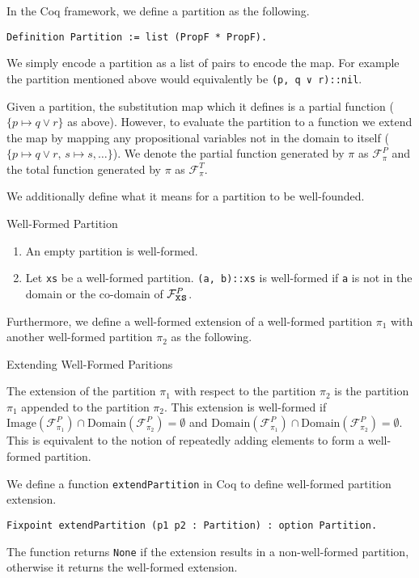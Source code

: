 \documentclass{llncs}
\begin{document}
In the Coq framework, we define a partition as the following.
%
\begin{verbatim}
Definition Partition := list (PropF * PropF).
\end{verbatim}
%
We simply encode a partition as a list of pairs to encode the map. For example
the partition mentioned above would equivalently be \verb+(p, q ∨ r)::nil+.

Given a partition, the substitution map which it defines is a partial function
($\{p \mapsto q \lor r\}$ as above). However, to evaluate the partition to a
function we extend the map by mapping any propositional variables not in the
domain to itself ($\{p \mapsto q \lor r, \, s \mapsto s, \ldots\}$). We denote
the partial function generated by $\pi$ as $\mathcal{F}^{P}_{\pi}$ and the
total function generated by $\pi$ as $\mathcal{F}^{T}_{\pi}$.

We additionally define what it means for a partition to be well-founded. 
%
\begin{definition}{Well-Formed Partition}
\begin{enumerate}
\item An empty partition is well-formed.
\item Let \verb+xs+ be a well-formed partition. \verb+(a, b)::xs+ is
well-formed if \verb+a+ is not in the domain or the co-domain of
$\mathcal{F}^{P}_{\verb+xs+}$.
\end{enumerate}
\end{definition}
%
Furthermore, we define a well-formed extension of a well-formed partition
$\pi_1$ with another well-formed partition $\pi_2$ as the following.

\begin{definition}{Extending Well-Formed Paritions}

The extension of the partition $\pi_1$ with respect to the partition $\pi_2$ is
the partition $\pi_1$ appended to the partition $\pi_2$. This extension is
well-formed if
$\textrm{Image}(\mathcal{F}^{P}_{\pi_1}) \cap
\textrm{Domain}(\mathcal{F}^{P}_{\pi_2}) = \emptyset$ and
$\textrm{Domain}(\mathcal{F}^{P}_{\pi_1}) \cap
\textrm{Domain}(\mathcal{F}^{P}_{\pi_2}) = \emptyset$. This is equivalent to
the notion of repeatedly adding elements to form a well-formed partition.
\end{definition}

We define a function \verb+extendPartition+ in Coq to define well-formed
partition extension.
%
\begin{verbatim}
Fixpoint extendPartition (p1 p2 : Partition) : option Partition.
\end{verbatim}
%
The function returns \verb+None+ if the extension results in a non-well-formed
partition, otherwise it returns the well-formed extension.
\end{document}
